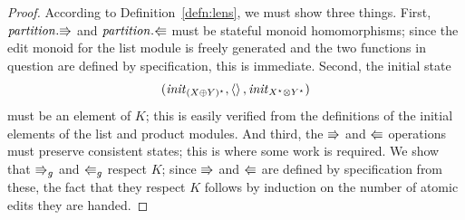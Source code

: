 \begin{proof}
According to Definition~\ref{defn:lens}, we must show three things.  First,
$\mathit{partition}.\mathord{\Rrightarrow}$ and $\mathit{partition}.\mathord{\Lleftarrow}$ must be stateful monoid
homomorphisms; since the edit monoid for the list module is freely
generated and the two functions in question are defined by specification,
this is immediate.  Second, the initial state \[(\mathit{init}_{(X \oplus
  Y)^\star}, \left<\right>, \mathit{init}_{X^\star \otimes Y^\star})\] must be an element of $K$;
this is easily verified from the definitions of the initial elements of the
list and product modules.  And third, the $\mathord{\Rrightarrow}$ and $\mathord{\Lleftarrow}$ operations
must preserve consistent states; this is where some work is required.  We
show that $\mathord{\Rrightarrow}_g$ and $\mathord{\Lleftarrow}_g$ respect $K$; since $\mathord{\Rrightarrow}$ and $\mathord{\Lleftarrow}$
are defined by specification from these, the fact that they respect $K$
follows by induction on the number of atomic edits they are handed.

\newcommand{\partitiondputrproof}{
We are given some $\dz \in G^{\mathrm{list}}_{X \oplus Y}$ such that
$\dz\;z$ is defined. We can define $(\dz',c')=\dputr\gen(\dz,c)$; then we
must show that $\dz'(x,y)$ is defined and that $(\dz\;z,c',\dz'(x,y)) \in
K$. We proceed by induction on the size of $\dz$.
\begin{trivlist}
\item {\bf Case \markref{rmodbigp}:}
    $\dv \in X \oplus Y$ and $\dz=\mlmod p\dv$ and $p > |c|$.

    \noindent
    Since $|z|=|c|$, we conclude that $\dz\;z$ is undefined, a
    contradiction.

\item {\bf Case \markref{rmodempty}:}
    $\dz=\mlmod p\NIL$ and $1 \le p \le |c|$.

    \noindent
    We calculate:
    \begin{align*}
        \dz' &= \NIL \\
        c' &= c \\
        \dz\;z &= z \\
        \dz'(x,y) &= (x,y)
    \end{align*}
    So $(\dz\;z,c',\dz'(x,y)) \in K$ by assumption:
    $(z,c,(x,y)) \in K$.


\end{trivlist}}
\end{proof}

